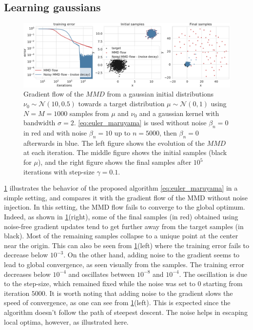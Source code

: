 \subsection{Learning gaussians}\label{sec:experiments_gaussian}
\begin{figure}[ht]
	\centering
	\includegraphics[width=0.8\linewidth]{figures/Gaussians_error_4}
	\caption{Gradient flow of the $MMD$ from a gaussian initial distributions $\nu_0\sim \mathcal{N}(10,0.5)$  towards a target distribution $\mu\sim \mathcal{N}(0,1)$ using $N=M=1000$ samples from $\mu$ and $\nu_0$ and a gaussian kernel with bandwidth $\sigma = 2 $. \cref{eq:euler_maruyama} is used 
	without noise $\beta_n = 0$ in red and  with noise $\beta_n = 10$ up to $n=5000$, then $\beta_n = 0$ afterwards in blue. 
	The left figure shows the evolution of the $MMD$ at each iteration. The middle figure shows the initial samples (black for $\mu$), and the right figure shows the final samples after $10^5$ iterations with step-size $\gamma = 0.1$.}
	\label{fig:experiments}
\end{figure}
\cref{fig:experiments} illustrates the behavior of the proposed algorithm \cref{eq:euler_maruyama} in a simple setting, and compares it with the gradient flow of the MMD without noise injection. In this setting, the MMD flow  fails to converge to the global optimum. Indeed, as shown in \cref{fig:experiments}(right), some of the final samples (in red) obtained using noise-free gradient updates tend to get further away from the target samples (in black). Most of the remaining samples collapse to a unique point at the center near the origin. This can also be seen from \cref{fig:experiments}(left) where the training error fails to decrease below $10^{-3}$. On the other hand, adding noise to the gradient seems to lead to global convergence, as seen visually from the samples. The training error decreases below $10^{-4}$ and oscillates between $10^{-8}$ and $10^{-4}$. The oscillation is due to the step-size, which remained fixed while the noise was set to $0$ starting from iteration $5000$. It is worth noting that adding noise to the gradient slows the speed of convergence, as one can see from \cref{fig:experiments}(left). This is expected since the algorithm doesn't follow the path of steepest descent. The noise helps in escaping local optima, however, as  illustrated here.

